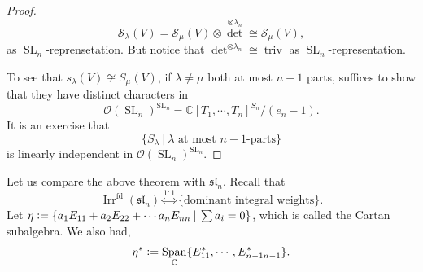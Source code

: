 \documentclass[10pt]{article}
\numberwithin{equation}{theorem}
\DeclareMathOperator{\triv}{triv}
\DeclareMathOperator{\Irr}{Irr}
\DeclareMathOperator{\SL}{SL}
\DeclareMathOperator{\Span}{Span}
\newcommand{\defeq}{\vcentcolon=}
\newcommand{\Ouv}[0]{\mathcal{O}}
\newcommand{\C}[0]{\mathbb{C}}
\newcommand{\sep}[0]{\:|\:}
\begin{document}
\begin{proof}
\begin{equation*}
    \mathcal{S}_\lambda(V) = \mathcal{S}_\mu(V)\otimes {\det}^{\otimes \lambda_n}\cong\mathcal{S}_\mu(V),
  \end{equation*}
  as $\SL_n$-reprensetation. But notice that ${\det}^{\otimes \lambda_n}\cong\triv$ as $\SL_n$-representation. \\
  \par To see that $s_\lambda(V) \not \cong S_\mu(V)$, if $\lambda\not=\mu$ both at most $n-1$ parts, suffices to show that they have distinct characters in 
  \begin{equation*}
    \Ouv(\SL_n)^{\SL_n}=\C[T_1,\cdots,T_n]^{S_n}/(e_n-1).
  \end{equation*}
  It is an exercise that 
  \begin{equation*}
    \{S_\lambda\sep \text{$\lambda$ at most $n-1$-parts}\}
  \end{equation*}
  is linearly independent in $\Ouv(\SL_n)^{\SL_n}$.
\end{proof}
Let us compare the above theorem with $\mathfrak{sl}_n$. Recall that 
\begin{equation*}
  \Irr^{\text{fd}}(\mathfrak{sl}_n) \stackrel{1:1}{\Leftrightarrow}\{\text{dominant integral weights}\}.
\end{equation*}
Let $\eta\defeq\{a_1E_{11}+a_2E_{22}+\cdots a_nE_{nn}\sep \sum a_i = 0\}$, which is called the Cartan subalgebra. We also had,
\begin{equation*}
  \eta^*\defeq \Span_\C\{E_{11}^*,\cdots,E_{n-1n-1}^*\}.
\end{equation*}
\end{document}

